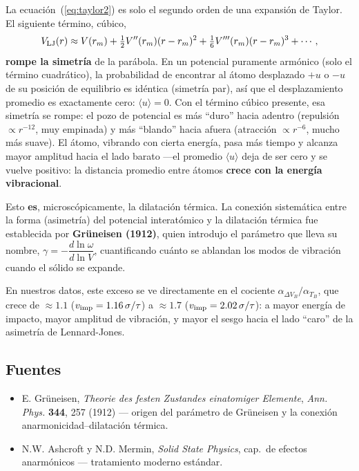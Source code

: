 \documentclass[11pt,a4paper]{article}
\begin{document}
La ecuación~(\ref{eq:taylor2}) es solo el segundo orden de una expansión
de Taylor. El siguiente término, cúbico,
\begin{equation}
V_{\rm LJ}(r) \approx V(r_m) + \tfrac12 V''(r_m)(r-r_m)^2
+ \tfrac16 V'''(r_m)(r-r_m)^3 + \cdots,
\end{equation}
\textbf{rompe la simetría} de la parábola. En un potencial puramente
armónico (solo el término cuadrático), la probabilidad de encontrar al
átomo desplazado $+u$ o $-u$ de su posición de equilibrio es idéntica
(simetría par), así que el desplazamiento promedio es exactamente cero:
$\langle u\rangle=0$. Con el término cúbico presente, esa simetría se
rompe: el pozo de potencial es más ``duro'' hacia adentro (repulsión
$\propto r^{-12}$, muy empinada) y más ``blando'' hacia afuera (atracción
$\propto r^{-6}$, mucho más suave). El átomo, vibrando con cierta energía,
pasa más tiempo y alcanza mayor amplitud hacia el lado barato ---el
promedio $\langle u\rangle$ deja de ser cero y se vuelve positivo: la
distancia promedio entre átomos \textbf{crece con la energía vibracional}.

Esto \textbf{es}, microscópicamente, la dilatación térmica. La conexión
sistemática entre la forma (asimetría) del potencial interatómico y la
dilatación térmica fue establecida por \textbf{Grüneisen (1912)}, quien
introdujo el parámetro que lleva su nombre,
$\gamma = -\dfrac{d\ln\omega}{d\ln V}$, cuantificando cuánto se ablandan
los modos de vibración cuando el sólido se expande.

En nuestros datos, este exceso se ve directamente en el cociente
$\alpha_{\Delta V_B}/\alpha_{T_B}$, que crece de $\approx1.1$
($v_{\rm imp}=1.16\,\sigma/\tau$) a $\approx1.7$
($v_{\rm imp}=2.02\,\sigma/\tau$): a mayor energía de impacto, mayor
amplitud de vibración, y mayor el sesgo hacia el lado ``caro'' de la
asimetría de Lennard-Jones.

\subsection{Fuentes}
\begin{itemize}[leftmargin=1.4em]
\item E. Grüneisen, \textit{Theorie des festen Zustandes einatomiger
Elemente}, \textit{Ann. Phys.} \textbf{344}, 257 (1912) --- origen del
parámetro de Grüneisen y la conexión anarmonicidad--dilatación térmica.
\item N.W. Ashcroft y N.D. Mermin, \textit{Solid State Physics}, cap.\ de
efectos anarmónicos --- tratamiento moderno estándar.
\end{itemize}
\end{document}
